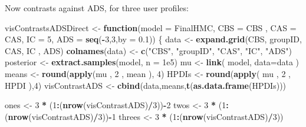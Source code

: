 \documentclass[10pt,dvipsnames,enabledeprecatedfontcommands]{scrartcl}
\newenvironment{Shaded}{\begin{snugshade}}{\end{snugshade}}
\newcommand{\KeywordTok}[1]{\textcolor[rgb]{0.13,0.29,0.53}{\textbf{#1}}}
\newcommand{\DataTypeTok}[1]{\textcolor[rgb]{0.13,0.29,0.53}{#1}}
\newcommand{\DecValTok}[1]{\textcolor[rgb]{0.00,0.00,0.81}{#1}}
\newcommand{\FloatTok}[1]{\textcolor[rgb]{0.00,0.00,0.81}{#1}}
\newcommand{\StringTok}[1]{\textcolor[rgb]{0.31,0.60,0.02}{#1}}
\newcommand{\ControlFlowTok}[1]{\textcolor[rgb]{0.13,0.29,0.53}{\textbf{#1}}}
\newcommand{\OperatorTok}[1]{\textcolor[rgb]{0.81,0.36,0.00}{\textbf{#1}}}
\newcommand{\NormalTok}[1]{#1}
\begin{document}
\normalsize

Now contrasts against \textsf{ADS}, for three user profiles:

\vspace{1mm} \footnotesize

\begin{Shaded}
\begin{Highlighting}[]
\NormalTok{visContrastsADSDirect <-}\StringTok{ }\ControlFlowTok{function}\NormalTok{(}\DataTypeTok{model =}\NormalTok{ FinalHMC, }\DataTypeTok{CBS =}\NormalTok{ CBS , }\DataTypeTok{CAS =}\NormalTok{ CAS, }\DataTypeTok{IC =}  \DecValTok{5}\NormalTok{, }
                            \DataTypeTok{ADS =} \KeywordTok{seq}\NormalTok{(}\OperatorTok{-}\DecValTok{3}\NormalTok{,}\DecValTok{3}\NormalTok{,}\DataTypeTok{by  =} \FloatTok{0.1}\NormalTok{))}
\NormalTok{\{}
\NormalTok{  data <-}\StringTok{ }\KeywordTok{expand.grid}\NormalTok{(CBS, groupID, CAS, IC , ADS)}
  \KeywordTok{colnames}\NormalTok{(data) <-}\StringTok{ }\KeywordTok{c}\NormalTok{(}\StringTok{"CBS"}\NormalTok{, }\StringTok{"groupID"}\NormalTok{, }\StringTok{"CAS"}\NormalTok{, }\StringTok{"IC"}\NormalTok{, }\StringTok{"ADS"}\NormalTok{)}
\NormalTok{  posterior <-}\StringTok{ }\KeywordTok{extract.samples}\NormalTok{(model, }\DataTypeTok{n =} \FloatTok{1e5}\NormalTok{)}
\NormalTok{  mu <-}\StringTok{ }\KeywordTok{link}\NormalTok{( model, }\DataTypeTok{data=}\NormalTok{data ) }
\NormalTok{  means <-}\StringTok{  }\KeywordTok{round}\NormalTok{(}\KeywordTok{apply}\NormalTok{(mu , }\DecValTok{2}\NormalTok{ , mean ), }\DecValTok{4}\NormalTok{)}
\NormalTok{  HPDIs <-}\StringTok{ }\KeywordTok{round}\NormalTok{(}\KeywordTok{apply}\NormalTok{( mu , }\DecValTok{2}\NormalTok{ , HPDI ),}\DecValTok{4}\NormalTok{)}
\NormalTok{  visContrastADS <-}\StringTok{ }\KeywordTok{cbind}\NormalTok{(data,means,}\KeywordTok{t}\NormalTok{(}\KeywordTok{as.data.frame}\NormalTok{(HPDIs)))}
  
  
\NormalTok{  ones <-}\StringTok{ }\DecValTok{3} \OperatorTok{*}\StringTok{ }\NormalTok{(}\DecValTok{1}\OperatorTok{:}\NormalTok{(}\KeywordTok{nrow}\NormalTok{(visContrastADS)}\OperatorTok{/}\DecValTok{3}\NormalTok{))}\OperatorTok{-}\DecValTok{2}
\NormalTok{  twos <-}\StringTok{ }\DecValTok{3} \OperatorTok{*}\StringTok{ }\NormalTok{(}\DecValTok{1}\OperatorTok{:}\NormalTok{(}\KeywordTok{nrow}\NormalTok{(visContrastADS)}\OperatorTok{/}\DecValTok{3}\NormalTok{))}\OperatorTok{-}\DecValTok{1}
\NormalTok{  threes <-}\StringTok{ }\DecValTok{3} \OperatorTok{*}\StringTok{ }\NormalTok{(}\DecValTok{1}\OperatorTok{:}\NormalTok{(}\KeywordTok{nrow}\NormalTok{(visContrastADS)}\OperatorTok{/}\DecValTok{3}\NormalTok{))}
  

\end{Highlighting}
\end{Shaded}
\end{document}
